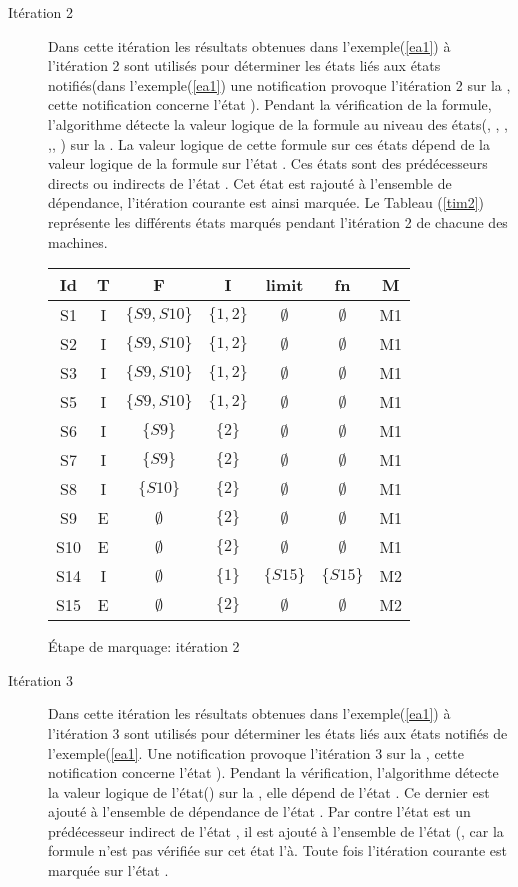 \begin{Exemple}
\begin{description}
	\item[Itération 2] Dans cette itération les résultats obtenues dans l'exemple(\ref{ea1}) à l'itération 2 sont utilisés pour déterminer les états liés aux états notifiés(dans l'exemple(\ref{ea1}) une notification provoque l'itération 2 sur la \mone{}, cette notification concerne l'état ). Pendant la vérification de la formule, l'algorithme détecte la valeur logique de la formule au niveau des états(, , , ,, ) sur la \mone{}. La valeur logique de cette formule sur ces états dépend de la valeur logique de la formule  sur l'état . Ces états sont des prédécesseurs directs ou indirects de l'état  . Cet état est rajouté à l'ensemble  de dépendance, l'itération courante est ainsi marquée. 
Le Tableau (\ref{tim2}) représente les différents états marqués pendant l'itération 2 de chacune des machines.  
	\begin{tableth}
	\centering
	\begin{tabular}{|*{7}{c|}}
		\hline
		Id&		T&			F&	I&	limit&	fn&		M\\
		\hline
		S1&	I&	$\{S9,S10\}$&	$\{1,2\}$&	$\emptyset$& $\emptyset$&		M1\\ \hline
		S2&	I&	$\{S9,S10\}$&	$\{1,2\}$&	$\emptyset$& $\emptyset$&		M1\\ \hline
		S3&	I&	$\{S9,S10\}$&	$\{1,2\}$&	$\emptyset$& $\emptyset$&		M1\\ \hline
		S5&	I&	$\{S9,S10\}$&	$\{1,2\}$&	$\emptyset$& $\emptyset$&		M1\\ \hline
		S6&	I&	$\{S9\}$	   &	$\{2\}$&	$\emptyset$& $\emptyset$&		M1\\ \hline
		S7&	I&	$\{S9\}$    &	$\{2\}$&	$\emptyset$& $\emptyset$&		M1\\ \hline
		S8&	I&	$\{S10\}$   &	$\{2\}$&	$\emptyset$& $\emptyset$&		M1\\ \hline
		S9&	E&	$\emptyset$&	$\{2\}$&	$\emptyset$& $\emptyset$&		M1\\ \hline
		S10&E&	$\emptyset$&	$\{2\}$&	$\emptyset$& $\emptyset$&		M1\\ \hline
		S14&I&	$\emptyset$&	$\{1\}$&	$\{S15\}$   & $\{S15\}$&			M2\\ \hline
		S15&E&	$\emptyset$&	$\{2\}$&	$\emptyset$& $\emptyset$&		M2\\				
		\hline
	\end{tabular}
	\caption{Étape de marquage: itération 2}\label{tim2}
\end{tableth}
	\item[Itération 3] Dans cette itération les résultats obtenues dans l'exemple(\ref{ea1}) à l'itération 3 sont utilisés pour déterminer les états liés aux états notifiés de l'exemple(\ref{ea1}. Une notification provoque l'itération 3 sur la \mtree{}, cette notification concerne l'état ). Pendant la vérification, l'algorithme détecte la valeur logique de l'état() sur la \mtree{}, elle dépend de l'état . Ce dernier est ajouté à l'ensemble  de dépendance de l'état . Par contre l'état  est un prédécesseur indirect de l'état , il est ajouté à l'ensemble  de l'état (, car la formule n'est pas vérifiée sur cet état l'à. Toute fois l'itération courante est marquée sur l'état . 

\end{description}
\end{Exemple}
